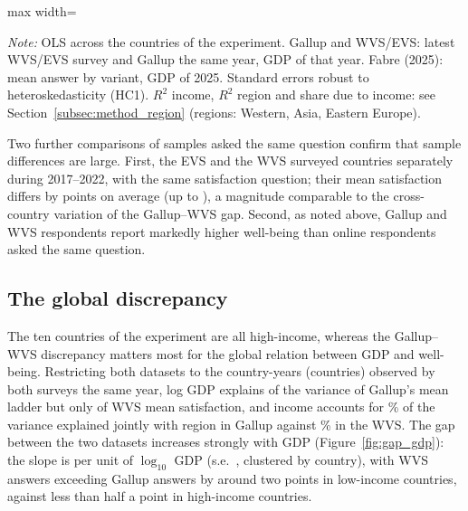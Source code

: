 \documentclass[12pt]{article}
\begin{document}
\begin{table}[htbp]
    \centering
    \caption{Income gradient of national well-being in the ten countries of the experiment: past vs.\ new data.}\label{tab:ten_countries}
    \begin{adjustbox}{max width=\textwidth}
    
    \end{adjustbox}
    \begin{minipage}{\textwidth}\footnotesize \textit{Note:} OLS across the \nDecompCountries countries of the experiment. Gallup and WVS/EVS: latest WVS/EVS survey and Gallup the same year, GDP of that year. Fabre (2025): mean answer by variant, GDP of 2025. Standard errors robust to heteroskedasticity (HC1). $R^2$ income, $R^2$ region and share due to income: see Section~\ref{subsec:method_region} (regions: Western, Asia, Eastern Europe).\end{minipage}
\end{table} %

Two further comparisons of samples asked the same question confirm that sample differences are large. First, the EVS and the WVS surveyed \nEVSvsWVS countries separately during 2017--2022, with the same satisfaction question; their mean satisfaction differs by \meanAbsDiffEVSWVS points on average (up to \maxAbsDiffEVSWVS), a magnitude comparable to the cross-country variation of the Gallup--WVS gap. 
Second, as noted above, Gallup and WVS respondents report markedly higher well-being than online respondents asked the same question. %

\subsection{The global discrepancy}\label{subsec:global_gap}

The ten countries of the experiment are all high-income, whereas the Gallup--WVS discrepancy matters most for the global relation between GDP and well-being. Restricting both datasets to the \nCommon country-years (\nCommonCountries countries) observed by both surveys the same year, log GDP explains \RtwoCommonGallup of the variance of Gallup's mean ladder but only \RtwoCommonWVS of WVS mean satisfaction, and income accounts for \shareIncomeCommonGallup\% of the variance explained jointly with region in Gallup against \shareIncomeCommonWVS\% in the WVS. The gap between the two datasets increases strongly with GDP (Figure~\ref{fig:gap_gdp}): the slope is \slopeGapGDP per unit of $\log_{10}$ GDP (s.e.\ \seSlopeGapGDP, clustered by country), with WVS answers exceeding Gallup answers by around two points in low-income countries, against less than half a point in high-income countries.
\end{document}
